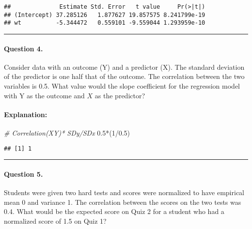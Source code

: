 \documentclass[
]{article}
\newenvironment{Shaded}{\begin{snugshade}}{\end{snugshade}}
\newcommand{\CommentTok}[1]{\textcolor[rgb]{0.56,0.35,0.01}{\textit{#1}}}
\newcommand{\DecValTok}[1]{\textcolor[rgb]{0.00,0.00,0.81}{#1}}
\newcommand{\FloatTok}[1]{\textcolor[rgb]{0.00,0.00,0.81}{#1}}
\newcommand{\NormalTok}[1]{#1}
\newcommand{\SpecialCharTok}[1]{\textcolor[rgb]{0.00,0.00,0.00}{#1}}
\begin{document}
\begin{verbatim}
##              Estimate Std. Error   t value     Pr(>|t|)
## (Intercept) 37.285126   1.877627 19.857575 8.241799e-19
## wt          -5.344472   0.559101 -9.559044 1.293959e-10
\end{verbatim}

\begin{center}\rule{0.5\linewidth}{0.5pt}\end{center}

\hypertarget{question-4.}{%
\paragraph{Question 4.}\label{question-4.}}

Consider data with an outcome (Y) and a predictor (X). The standard
deviation of the predictor is one half that of the outcome. The
correlation between the two variables is 0.5. What value would the slope
coefficient for the regression model with Y as the outcome and \(X\) as
the predictor?

\hypertarget{explanation-3}{%
\paragraph{Explanation:}\label{explanation-3}}

\begin{Shaded}
\begin{Highlighting}[]
\CommentTok{\# Correlation(XY)* SDy/SDx}
\FloatTok{0.5}\SpecialCharTok{*}\NormalTok{(}\DecValTok{1}\SpecialCharTok{/}\FloatTok{0.5}\NormalTok{)}
\end{Highlighting}
\end{Shaded}

\begin{verbatim}
## [1] 1
\end{verbatim}

\begin{center}\rule{0.5\linewidth}{0.5pt}\end{center}

\hypertarget{question-5.}{%
\paragraph{Question 5.}\label{question-5.}}

Students were given two hard tests and scores were normalized to have
empirical mean 0 and variance 1. The correlation between the scores on
the two tests was 0.4. What would be the expected score on Quiz 2 for a
student who had a normalized score of 1.5 on Quiz 1?
\end{document}
